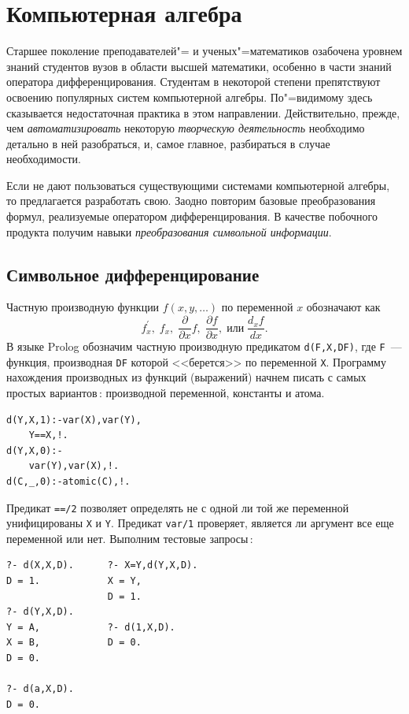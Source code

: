 \documentclass[a4paper,14pt, openany, twoside, draft]{extbook} %
\begin{document}
\chapter{Компьютерная алгебра}
\label{cha:compalgebra}

Старшее поколение преподавателей"= и ученых"=математиков озабочена уровнем знаний студентов вузов в области высшей математики, особенно в части знаний оператора дифференцирования.  Студентам в некоторой степени препятствуют освоению популярных систем компьютерной алгебры.  По"=видимому здесь сказывается недостаточная практика в этом направлении.  Действительно, прежде, чем \emph{автоматизировать} некоторую \emph{творческую деятельность} необходимо детально в ней разобраться, и, самое главное, разбираться в случае необходимости.

Если не дают пользоваться существующими системами компьютерной алгебры, то предлагается разработать свою.  Заодно повторим базовые преобразования формул, реализуемые оператором дифференцирования.  В качестве побочного продукта получим навыки \emph{преобразования символьной информации}.

\section{Символьное дифференцирование}
\label{sec:}


Частную производную функции $f(x,y,\ldots)$ по переменной $x$ обозначают как
$$
f^{\prime}_x,\;f_x,\;\frac{\partial }{\partial x}f,\;\frac{\partial f}{\partial x}, \;\mbox{или}\; \frac{d_x f}{dx}.
$$
В языке Prolog обозначим частную производную предикатом \texttt{d(F,X,DF)}, где \texttt{F}~--- функция, производная \texttt{DF} которой <<берется>> по переменной \texttt{X}.  Программу нахождения производных из функций (выражений) начнем писать с самых простых вариантов\,: производной переменной, константы и атома.

\begin{verbatim}
d(Y,X,1):-var(X),var(Y),
    Y==X,!.
d(Y,X,0):-
    var(Y),var(X),!.
d(C,_,0):-atomic(C),!.
\end{verbatim}

Предикат \texttt{==/2} позволяет определять не с одной ли той же переменной унифицированы \texttt{X} и \texttt{Y}.  Предикат \texttt{var/1} проверяет, является ли аргумент все еще переменной или нет.  Выполним тестовые запросы\,:

\begin{verbatim}
?- d(X,X,D).      ?- X=Y,d(Y,X,D).
D = 1.            X = Y,
                  D = 1.
?- d(Y,X,D).
Y = A,            ?- d(1,X,D).
X = B,            D = 0.
D = 0.

?- d(a,X,D).
D = 0.
\end{verbatim}
\end{document}
